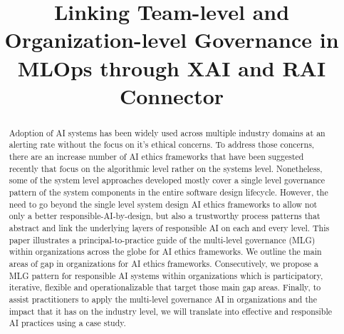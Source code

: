 \documentclass[conference]{IEEEtran}
\begin{document}
\nocite{*}

\title{Linking Team-level and Organization-level Governance in MLOps through XAI and RAI Connector  \\
}

\author{

\and

}

\maketitle

\begin{abstract}
	Adoption of AI systems has been widely used across multiple industry domains at an alerting rate without the focus on it's ethical concerns. To address those concerns, there are an increase number of AI ethics frameworks that have been suggested recently that focus on the algorithmic level rather on the systems level. Nonetheless, some of the system level approaches developed mostly cover a single level governance pattern of the system components in the entire software design lifecycle. However, the need to go beyond the single level  system design AI ethics frameworks to allow not only a better responsible-AI-by-design, but also a trustworthy process patterns that abstract and link the underlying layers of responsible AI on each and every level. This paper illustrates a principal-to-practice guide of the multi-level governance (MLG) within organizations across the globe for AI ethics frameworks. We outline the main areas of gap in organizations for AI ethics frameworks. Consecutively, we propose a MLG pattern for responsible AI systems within organizations which is participatory, iterative, flexible and operationalizable that target those main gap areas. Finally, to assist practitioners to apply the multi-level governance AI in organizations and the impact that it has on the industry level, we will translate into effective and responsible AI practices using a case study.
\end{abstract}
\end{document}

